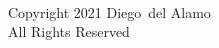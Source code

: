

\chapter*{}
\hspace{1em}\vspace{18em} \\ %
\begin{center}
    Copyright {\textcopyright} 2021 Diego~del Alamo \\
    All Rights Reserved     
\end{center}


